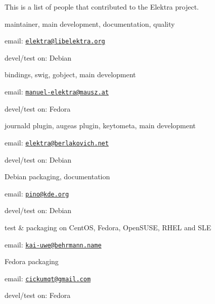 This is a list of people that contributed to the Elektra project.

maintainer, main development, documentation, quality


\begin{DoxyItemize}
\item email\+: \href{mailto:elektra@libelektra.org}{\tt elektra@libelektra.\+org}
\item devel/test on\+: Debian
\end{DoxyItemize}

bindings, swig, gobject, main development


\begin{DoxyItemize}
\item email\+: \href{mailto:manuel-elektra@mausz.at}{\tt manuel-\/elektra@mausz.\+at}
\item devel/test on\+: Fedora
\end{DoxyItemize}

journald plugin, augeas plugin, keytometa, main development


\begin{DoxyItemize}
\item email\+: \href{mailto:elektra@berlakovich.net}{\tt elektra@berlakovich.\+net}
\item devel/test on\+: Debian
\end{DoxyItemize}

Debian packaging, documentation


\begin{DoxyItemize}
\item email\+: \href{mailto:pino@kde.org}{\tt pino@kde.\+org}
\item devel/test on\+: Debian
\end{DoxyItemize}

test \& packaging on Cent\+OS, Fedora, Open\+S\+U\+SE, R\+H\+EL and S\+LE


\begin{DoxyItemize}
\item email\+: \href{mailto:kai-uwe@behrmann.name}{\tt kai-\/uwe@behrmann.\+name}
\end{DoxyItemize}

Fedora packaging


\begin{DoxyItemize}
\item email\+: \href{mailto:cickumqt@gmail.com}{\tt cickumqt@gmail.\+com}
\item devel/test on\+: Fedora
\end{DoxyItemize}

